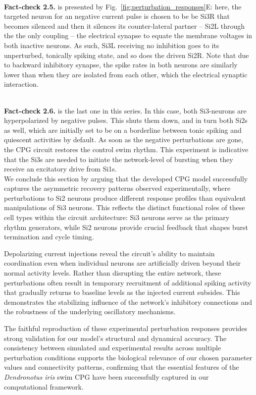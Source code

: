 \documentclass[nofootinbib,aip,amsmath,amssymb,reprint,twocolumn,10pt]{revtex4-2}
\begin{document}
~\\
{\bf Fact-check 2.5.} is presented by Fig.~\ref{fig:perturbation_responses}E: here, the targeted neuron for an negative current pulse is chosen to be be Si3R  that becomes silenced and then it silences its counter-lateral partner -- Si2L through the the only coupling -- the electrical synapse to equate the membrane voltages in both inactive neurons. As such, Si3L receiving no inhibition goes to its unperturbed, tonically spiking state, and so does the driven Si2R. Note that due to backward inhibitory synapse, the spike rates in both neurons are similarly lower than when they are isolated from each other, which the electrical synaptic interaction.   

~\\
{\bf Fact-check 2.6.} is the last one in this series. In this case, both Si3-neurons are hyperpolarized by negative pulses. This shuts them down, and in turn both Si2s as well, which are initially set to be on a borderline between tonic spiking and quiescent activities by default.  As soon as the negative perturbations are gone, the CPG circuit restores the control swim rhythm. This experiment is indicative that the Si3s are needed to initiate the network-level of bursting when they receive an excitatory drive from Si1s.  \\   


We conclude this section by arguing that the developed CPG model successfully captures the asymmetric recovery patterns observed experimentally, where perturbations to Si2 neurons produce different response profiles than equivalent manipulations of Si3 neurons. This reflects the distinct functional roles of these cell types within the circuit architecture: Si3 neurons serve as the primary rhythm generators, while Si2 neurons provide crucial feedback that shapes burst termination and cycle timing.

Depolarizing current injections reveal the circuit's ability to maintain coordination even when individual neurons are artificially driven beyond their normal activity levels. Rather than disrupting the entire network, these perturbations often result in temporary recruitment of additional spiking activity that gradually returns to baseline levels as the injected current subsides. This demonstrates the stabilizing influence of the network's inhibitory connections and the robustness of the underlying oscillatory mechanisms.

The faithful reproduction of these experimental perturbation responses provides strong validation for our model's structural and dynamical accuracy. The consistency between simulated and experimental results across multiple perturbation conditions supports the biological relevance of our chosen parameter values and connectivity patterns, confirming that the essential features of the \textit{Dendronotus iris} swim CPG have been successfully captured in our computational framework.
\end{document}
